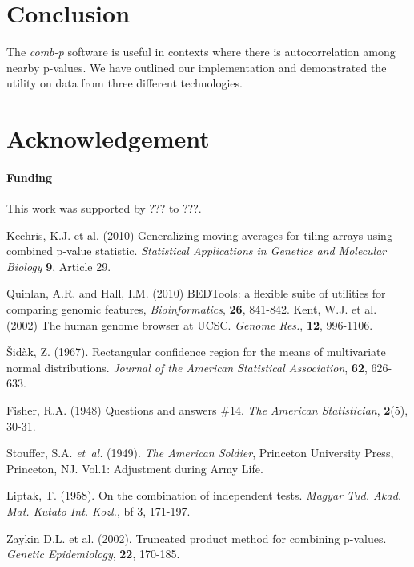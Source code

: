 \documentclass{bioinfo}
\begin{document}
\section{Conclusion}
The \textit{comb-p} software is useful in contexts where there is
autocorrelation among nearby p-values. We have outlined our implementation
and demonstrated the utility on data from three different technologies.

\section*{Acknowledgement}

\paragraph{Funding\textcolon} This work was supported by ??? to ???.

%
%
%
%
%
%
%

\begin{thebibliography}{}
Kechris, K.J. et al. (2010)
Generalizing moving averages for tiling arrays using combined p-value
statistic. {\it Statistical Applications in Genetics and Molecular Biology}
{\bf 9}, Article 29.

 Quinlan, A.R. and Hall, I.M. (2010) BEDTools: a flexible suite of utilities for comparing genomic features, {\it Bioinformatics}, {\bf 26}, 841-842.
 Kent, W.J. et al. (2002) The human genome browser at UCSC. {\it Genome Res.}, {\bf 12}, 996-1106.

Šidàk, Z. (1967).
Rectangular conﬁdence region for the means of multivariate normal distributions.
\textit{Journal of the American Statistical Association}, {\bf 62}, 626-633.

Fisher, R.A. (1948)
Questions and answers \#14.
{\it The American Statistician}, {\bf 2}(5), 30-31.

Stouffer, S.A. \textit{et~al.} (1949). \textit{The American Soldier},
Princeton University Press, Princeton, NJ. Vol.1: Adjustment during Army Life.

Liptak, T. (1958). On the combination of independent tests. {\it Magyar Tud. Akad. Mat. Kutato Int. Kozl.}, {bf 3}, 171-197.

 Zaykin D.L. et al. (2002).
Truncated product method for combining p-values. {\it Genetic Epidemiology},
{\bf 22}, 170-185.


\end{thebibliography}
\end{document}
